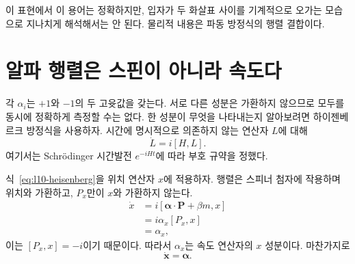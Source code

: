 이 표현에서 이 용어는 정확하지만, 입자가 두 화살표 사이를 기계적으로 오가는 모습으로 지나치게 해석해서는 안 된다. 물리적 내용은 파동 방정식의 행렬 결합이다.

\begin{classroomqa}\end{classroomqa}

\begin{classroomqa}\end{classroomqa}

\section{알파 행렬은 스핀이 아니라 속도다}

각 \(\alpha_i\)는 \(+1\)와 \(-1\)의 두 고윳값을 갖는다. 서로 다른 성분은 가환하지 않으므로 모두를 동시에 정확하게 측정할 수는 없다. 한 성분이 무엇을 나타내는지 알아보려면 하이젠베르크 방정식을 사용하자. 시간에 명시적으로 의존하지 않는 연산자 \(L\)에 대해
\begin{equation}
\dot L=i[H,L].
\label{eq:l10-heisenberg}
\end{equation}
여기서는 Schr\"odinger 시간발전 \(e^{-iHt}\)에 따라 부호 규약을 정했다.

식~\eqref{eq:l10-heisenberg}을 위치 연산자 \(x\)에 적용하자. 행렬은 스피너 첨자에 작용하며 위치와 가환하고, \(P_x\)만이 \(x\)와 가환하지 않는다.
\begin{align}
\dot x
&=i[\boldsymbol{\alpha}\cdot\mathbf P+\beta m,x]\\
&=i\alpha_x[P_x,x]\\
&=\alpha_x,
\label{eq:l10-velocity}
\end{align}
이는 \([P_x,x]=-i\)이기 때문이다. 따라서 \(\alpha_x\)는 속도 연산자의 \(x\) 성분이다. 마찬가지로
\begin{equation}
\dot{\mathbf x}=\boldsymbol{\alpha}.
\end{equation}

